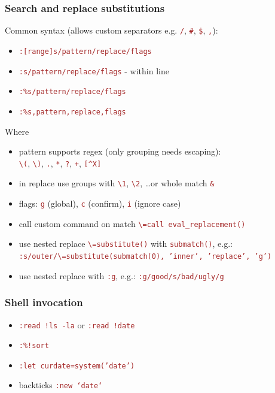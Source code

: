 \documentclass{beamer}
\newcommand{\vimcommand}[1]{\texttt{\textcolor{brown}{#1}}}
\begin{document}
\begin{frame}
    \frametitle{Search and replace substitutions}
    Common syntax (allows custom separators e.g. \vimcommand{/}, \vimcommand{\#}, \vimcommand{\$}, \vimcommand{,}):
    {\footnotesize 
    \begin{itemize}
        \item \vimcommand{:[range]s/pattern/replace/flags}
        \item \vimcommand{:s/pattern/replace/flags} - within line
        \item \vimcommand{:\%s/pattern/replace/flags}
        \item \vimcommand{:\%s,pattern,replace,flags}
    \end{itemize}
    }
    Where
    \begin{itemize}
        \item pattern supports regex (only grouping needs escaping):\\
          \vimcommand{\textbackslash{(}}, \vimcommand{\textbackslash{)}}, \vimcommand{.}, \vimcommand{*}, \vimcommand{?}, \vimcommand{+}, \vimcommand{[\string^X]}
        \item in replace use groups with \vimcommand{\textbackslash{1}}, \vimcommand{\textbackslash{2}}, \ldots or whole match \vimcommand{\&}
        \item flags: \vimcommand{g} (global), \vimcommand{c} (confirm), \vimcommand{i} (ignore case)
        \item call custom command on match {\footnotesize \vimcommand{\textbackslash{=}call eval\_replacement()}}
        \item use nested replace \vimcommand{\textbackslash{=}substitute()} with \vimcommand{submatch()}, e.g.:
    {\footnotesize 
          \vimcommand{:s/outer/\textbackslash{=}substitute(submatch(0), 'inner', 'replace', 'g')}
    }
        \item use nested replace with \vimcommand{:g}, e.g.: \vimcommand{:g/good/s/bad/ugly/g}
    \end{itemize}
\end{frame}

\begin{frame}
    \frametitle{Shell invocation}
    \begin{itemize}
      \item \vimcommand{:read !ls -la} or \vimcommand{:read !date}
      \item \vimcommand{:\%!sort}\
      \item \vimcommand{:let curdate=system('date')}
      \item backticks \vimcommand{:new `date`}
    \end{itemize}
\end{frame}
\end{document}
